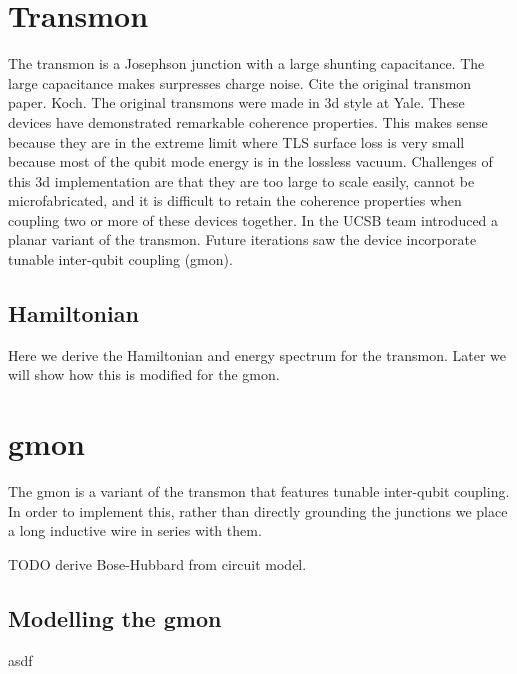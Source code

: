 \section{Transmon}
The transmon is a Josephson junction with a large shunting capacitance.
The large capacitance makes  surpresses charge noise.
Cite the original transmon paper. Koch.
The original transmons were made in 3d style at Yale.  These devices have demonstrated remarkable coherence properties.
This makes sense because they are in the extreme limit where TLS surface loss is very small because most of the qubit mode energy is in the lossless vacuum.
Challenges of this 3d implementation are that they are too large to scale easily,
cannot be microfabricated,
and it is difficult to retain the coherence properties when coupling two or more of these devices together.
In  the UCSB team introduced a planar variant of the transmon.
Future iterations saw the device incorporate tunable inter-qubit coupling (gmon).

\subsection{Hamiltonian}
Here we derive the Hamiltonian and energy spectrum for the transmon.  Later we will show how this is modified for the gmon.

\section{gmon}
The gmon is a variant of the transmon that features tunable inter-qubit coupling.  In order to implement this, rather than directly grounding the junctions we place a long inductive wire in series with them.

TODO derive Bose-Hubbard from circuit model.
\subsection{Modelling the gmon}
asdf

